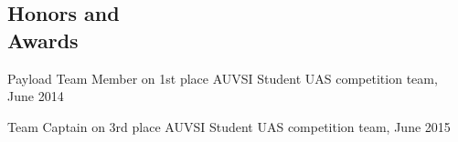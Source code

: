 \documentclass[margin,line]{resume}
\begin{document}
\begin{resume}
    \section{\mysidestyle Honors and\\Awards}

    Payload Team Member on 1st place AUVSI Student UAS competition team, June 2014\\
	\vspace{-8mm}

	Team Captain on 3rd place AUVSI Student UAS competition team, June 2015\\
	\vspace{-8mm}

\end{resume}
\end{document}
